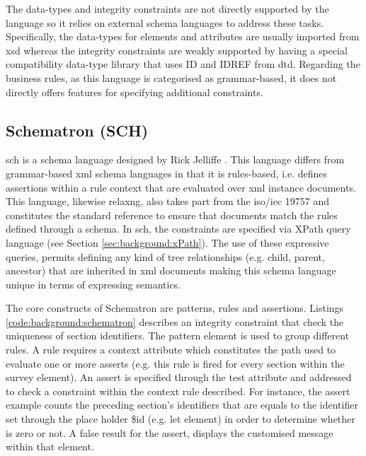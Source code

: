 	The data-types and integrity constraints are not directly supported by the language so it relies on external schema languages to address these tasks. Specifically, the data-types for elements and attributes are usually imported from \gls{xsd} whereas the integrity constraints are weakly supported by having a special compatibility data-type library that uses ID and IDREF from \gls{dtd}. Regarding the business rules, as this language is categorised as grammar-based, it does not directly offers features for specifying additional constraints.

	\subsection{Schematron (SCH)}\label{sec:background:sch}
	\gls{sch} is a schema language designed by Rick Jelliffe \cite{web:doodds01}. This language differs from grammar-based \gls{xml} schema languages in that it is rules-based, i.e. defines assertions within a rule context that are evaluated over \gls{xml} instance documents. This language, likewise \gls{relaxng}, also takes part from the \gls{iso}/\gls{iec} 19757 and constitutes the standard reference to ensure that documents match the rules defined through a schema. In \gls{sch}, the constraints are specified via XPath query language (see Section \ref{sec:background:xPath}). The use of these expressive queries, permits defining any kind of tree relationships (e.g. child, parent, ancestor) that are inherited in \gls{xml} documents making this schema language unique in terms of expressing semantics.

	The core constructs of Schematron are patterns, rules and assertions. Listings \ref{code:background:schematron} describes an integrity constraint that check the uniqueness of section identifiers. The pattern element is used to group different rules. A rule requires a context attribute which constitutes the path used to evaluate one or more asserts (e.g. this rule is fired for every section within the survey element). An assert is specified through the test attribute and addressed to check a constraint within the context rule described. For instance, the assert example counts the preceding section's identifiers that are equals to the identifier set through the place holder \$id (e.g. let element) in order to determine whether is zero or not. A false result for the assert, displays the customised message within that element.  
	

